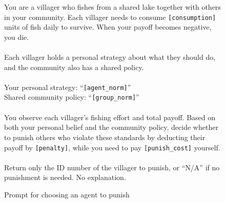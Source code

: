 \documentclass[sigconf]{aamas}
\begin{document}
\begin{appendix}
\begin{figure}[h!]
\centering
\begin{mdframed}[linewidth=1pt, linecolor=gray!50, backgroundcolor=gray!5]
\footnotesize
You are a villager who fishes from a shared lake together with others in your community.
Each villager needs to consume \texttt{[consumption]} units of fish daily to survive. When your payoff becomes negative, you die. \\
\\
Each villager holds a personal strategy about what they should do, and the community also has a shared policy. \\
\\
Your personal strategy: ``\texttt{[agent\_norm]}'' \\
Shared community policy: ``\texttt{[group\_norm]}'' \\
\\
You observe each villager's fishing effort and total payoff.
Based on both your personal belief and the community policy, decide whether to punish others who violate these standards by deducting their payoff by \texttt{[penalty]}, while you need to pay \texttt{[punish\_cost]} yourself. \\
\\
Return only the ID number of the villager to punish, or ``N/A'' if no punishment is needed. No explanation.
\end{mdframed}
\caption{Prompt for choosing an agent to punish}
\label{fig:prompt_punish}
\end{figure}


\end{appendix}
\end{document}
